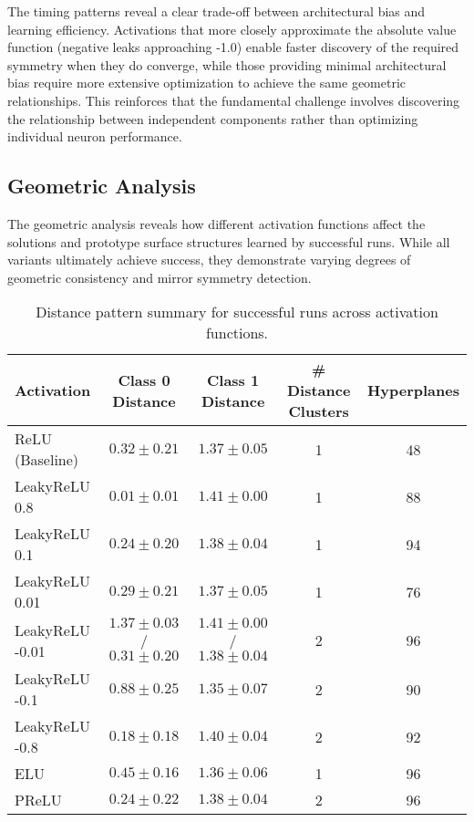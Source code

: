 The timing patterns reveal a clear trade-off between architectural bias and learning efficiency. Activations that more closely approximate the absolute value function (negative leaks approaching -1.0) enable faster discovery of the required symmetry when they do converge, while those providing minimal architectural bias require more extensive optimization to achieve the same geometric relationships. This reinforces that the fundamental challenge involves discovering the relationship between independent components rather than optimizing individual neuron performance.


\subsection*{Geometric Analysis}

The geometric analysis reveals how different activation functions affect the solutions and prototype surface structures learned by successful runs. While all variants ultimately achieve success, they demonstrate varying degrees of geometric consistency and mirror symmetry detection.

\begin{table}[ht]
\centering
\caption{Distance pattern summary for successful runs across activation functions.}
\label{tab:relu1-activation-distance}
\begin{tabular}{lcccc}
\toprule
Activation & Class 0 Distance & Class 1 Distance & \# Distance Clusters & Hyperplanes \\
\midrule
ReLU (Baseline) & $0.32 \pm 0.21$ & $1.37 \pm 0.05$ & 1 & 48 \\
LeakyReLU 0.8 & $0.01 \pm 0.01$ & $1.41 \pm 0.00$ & 1 & 88 \\
LeakyReLU 0.1 & $0.24 \pm 0.20$ & $1.38 \pm 0.04$ & 1 & 94 \\
LeakyReLU 0.01 & $0.29 \pm 0.21$ & $1.37 \pm 0.05$ & 1 & 76 \\
LeakyReLU -0.01 & $1.37 \pm 0.03$ / $0.31 \pm 0.20$ & $1.41 \pm 0.00$ / $1.38 \pm 0.04$ & 2 & 96 \\
LeakyReLU -0.1 & $0.88 \pm 0.25$ & $1.35 \pm 0.07$ & 2 & 90 \\
LeakyReLU -0.8 & $0.18 \pm 0.18$ & $1.40 \pm 0.04$ & 2 & 92 \\
ELU & $0.45 \pm 0.16$ & $1.36 \pm 0.06$ & 1 & 96 \\
PReLU & $0.24 \pm 0.22$ & $1.38 \pm 0.04$ & 2 & 96 \\
\bottomrule
\end{tabular}
\end{table}

